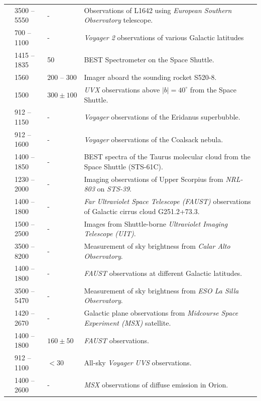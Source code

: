 \documentclass{iau}
\begin{document}
\begin{longtable}{lllp{9cm}}
\citet{Mattila1990} & 3500 -- 5550 & - & Observations of L1642 using \textit{European Southern Observatory} telescope. \\
\citet{Murthy1991} & 700 -- 1100 & - & \textit{Voyager 2} observations of various Galactic latitudes \\
\citet{Hurwitz1991} & 1415 -- 1835 & 50 & BEST Spectrometer on the Space Shuttle. \\
\citet{Onaka1991} & 1560 & 200 -- 300 & Imager aboard the sounding rocket S520-8. \\
\citet{Henry1993} & 1500 & $300 \pm 100$ & \textit{UVX} observations above $|b|=40^{\circ}$ from the Space Shuttle. \\
\citet{Murthyvoy1993} & 912 -- 1150 & - & \textit{Voyager} observations of the Eridanus superbubble. \\
\citet{Murthy_CS1994} & 912 -- 1600 & - & \textit{Voyager} observations of the Coalsack nebula. \\
\citet{Hurwitz1994} & 1400 -- 1850 & - & BEST spectra of the Taurus molecular cloud from the Space Shuttle (STS-61C). \\
\citet{Gordon1994} & 1230 -- 2000 & - & Imaging observations of Upper Scorpius from \textit{NRL-803} on \textit{STS-39}. \\
\citet{Haikala1995} & 1400 -- 1800 & - & \textit{Far Ultraviolet Space Telescope (FAUST)} observations of Galactic cirrus cloud G251.2+73.3. \\
\citet{Waller1995} & 1500 -- 2500 & - & Images from Shuttle-borne \textit{Ultraviolet Imaging Telescope (UIT)}. \\
\citet{Leinert1995} & 3500 -- 8200 & - & Measurement of sky brightness from \textit{Calar Alto Observatory}. \\
\citet{Sasseen1996} & 1400 -- 1800 & - & \textit{FAUST} observations at different Galactic latitudes. \\
\citet{Mattila1996} & 3500 -- 5470 & - & Measurement of sky brightness from \textit{ESO La Silla Observatory}. \\
\citet{Murthy1997} & 1420 -- 2670 & - & Galactic plane observations from \textit{Midcourse Space Experiment (MSX)} satellite. \\
\citet{Witt1997} & 1400 -- 1800 & $160 \pm 50$ & \textit{FAUST} observations. \\
\citet{Murthy_voy} & 912 -- 1100 & $<$30 & All-sky \textit{Voyager} \textit{UVS} observations. \\
\citet{Murthy2001} & 1400 -- 2600 & - & \textit{MSX} observations of diffuse emission in Orion. \\

\end{longtable}
\end{document}
